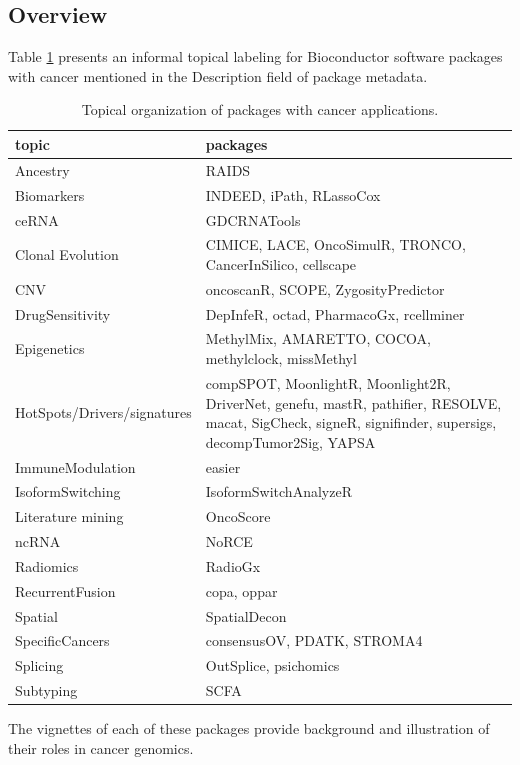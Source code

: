 \documentclass[]{article}
\begin{document}
\hypertarget{overview}{%
\subsection{Overview}\label{overview}}

Table \ref{tab:tab-wflow} presents an informal topical
labeling for Bioconductor software packages with
cancer mentioned in the Description field of package
metadata.

\begin{longtable}[t]{l>{\raggedright\arraybackslash}p{30em}}
\caption{\label{tab:tab-wflow}Topical organization of packages with cancer applications.}\\
\toprule
topic & packages\\
\midrule
Ancestry & RAIDS\\
Biomarkers & INDEED, iPath, RLassoCox\\
ceRNA & GDCRNATools\\
Clonal Evolution & CIMICE, LACE, OncoSimulR, TRONCO, CancerInSilico, cellscape\\
CNV & oncoscanR, SCOPE, ZygosityPredictor\\
\addlinespace
DrugSensitivity & DepInfeR, octad, PharmacoGx, rcellminer\\
Epigenetics & MethylMix, AMARETTO, COCOA, methylclock, missMethyl\\
HotSpots/Drivers/signatures & compSPOT, MoonlightR, Moonlight2R, DriverNet, genefu, mastR, pathifier, RESOLVE, macat, SigCheck, signeR, signifinder, supersigs, decompTumor2Sig, YAPSA\\
ImmuneModulation & easier\\
IsoformSwitching & IsoformSwitchAnalyzeR\\
\addlinespace
Literature mining & OncoScore\\
ncRNA & NoRCE\\
Radiomics & RadioGx\\
RecurrentFusion & copa, oppar\\
Spatial & SpatialDecon\\
\addlinespace
SpecificCancers & consensusOV, PDATK, STROMA4\\
Splicing & OutSplice, psichomics\\
Subtyping & SCFA\\
\bottomrule
\end{longtable}

The vignettes of each of these packages provide background and
illustration of their roles in cancer genomics.
\end{document}
